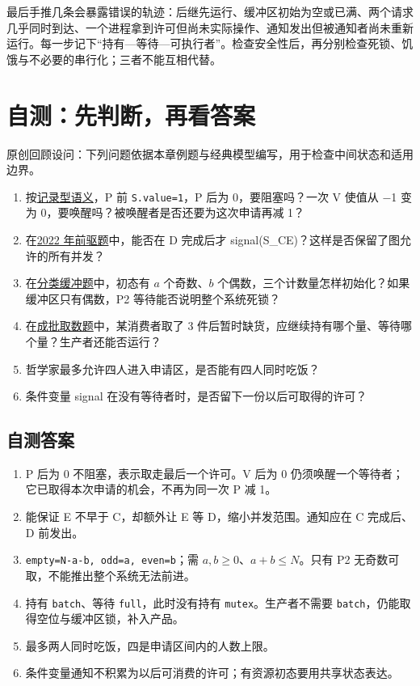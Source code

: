 最后手推几条会暴露错误的轨迹：后继先运行、缓冲区初始为空或已满、两个请求几乎同时到达、一个进程拿到许可但尚未实际操作、通知发出但被通知者尚未重新运行。每一步记下``持有---等待---可执行者''。检查安全性后，再分别检查死锁、饥饿与不必要的串行化；三者不能互相代替。

\section{自测：先判断，再看答案}\label{sec-selfcheck}

原创回顾设问：下列问题依据本章例题与经典模型编写，用于检查中间状态和适用边界。

\begin{enumerate}
\def\labelenumi{\arabic{enumi}.}
\tightlist
\item
  按\hyperref[sec-semaphore]{记录型语义}，P 前 \texttt{S.value=1}，P 后为 0，要阻塞吗？一次 V 使值从 −1 变为 0，要唤醒吗？被唤醒者是否还要为这次申请再减 1？
\item
  在\hyperref[ex-2022]{2022 年前驱题}中，能否在 D 完成后才 signal(S\_CE)？这样是否保留了图允许的所有并发？
\item
  在\hyperref[ex-2009]{分类缓冲题}中，初态有 \(a\) 个奇数、\(b\) 个偶数，三个计数量怎样初始化？如果缓冲区只有偶数，P2 等待能否说明整个系统死锁？
\item
  在\hyperref[ex-2014]{成批取数题}中，某消费者取了 3 件后暂时缺货，应继续持有哪个量、等待哪个量？生产者还能否运行？
\item
  哲学家最多允许四人进入申请区，是否能有四人同时吃饭？
\item
  条件变量 signal 在没有等待者时，是否留下一份以后可取得的许可？
\end{enumerate}

\subsection{自测答案}\label{os-c03-h568}

\begin{enumerate}
\def\labelenumi{\arabic{enumi}.}
\tightlist
\item
  P 后为 0 不阻塞，表示取走最后一个许可。V 后为 0 仍须唤醒一个等待者；它已取得本次申请的机会，不再为同一次 P 减 1。
\item
  能保证 E 不早于 C，却额外让 E 等 D，缩小并发范围。通知应在 C 完成后、D 前发出。
\item
  \texttt{empty=N-a-b,}\allowbreak{}\texttt{\ odd=a,}\allowbreak{}\texttt{\ even=b}；需 \(a,b\ge0\)、\(a+b\le N\)。只有 P2 无奇数可取，不能推出整个系统无法前进。
\item
  持有 \texttt{batch}、等待 \texttt{full}，此时没有持有 \texttt{mutex}。生产者不需要 \texttt{batch}，仍能取得空位与缓冲区锁，补入产品。
\item
  最多两人同时吃饭，四是申请区间内的人数上限。
\item
  条件变量通知不积累为以后可消费的许可；有资源初态要用共享状态表达。
\end{enumerate}

